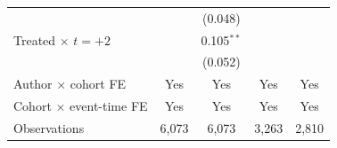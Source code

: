 \begin{center}
\begin{table}[t]
\begin{tabular}{lcccc}
 &  & (0.048) &  &  \\
\quad Treated $\times$ $t=+2$ &  & 0.105$^{**}$ &  &  \\
 &  & (0.052) &  &  \\
\midrule
Author $\times$ cohort FE & Yes & Yes & Yes & Yes \\
Cohort $\times$ event-time FE & Yes & Yes & Yes & Yes \\
Observations & 6,073 & 6,073 & 3,263 & 2,810 \\
\bottomrule
\end{tabular}
\end{table}
\markersintext
\end{center}
